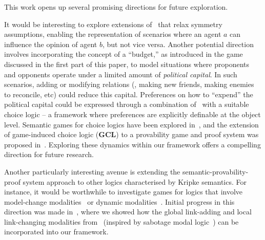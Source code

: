 
This work opens up several promising directions for future exploration.

It would be interesting to explore extensions of \PNL\ that relax symmetry assumptions, enabling the representation of scenarios where an agent $a$ can influence the opinion of agent $b$, but not vice versa. Another potential direction involves incorporating the concept of a ``budget,'' as introduced in the game discussed in the first part of this paper, to model situations where proponents and opponents operate under a limited amount of \emph{political capital}. In such scenarios, adding or modifying relations (\ie, making new friends, making enemies to reconcile, etc) could reduce this capital.
Preferences on how to ``expend'' the political capital could be expressed through a combination of \PNL\ with a suitable choice logic -- a framework where preferences are explicitly definable at the object level. Semantic games for choice logics have been explored in~\cite{Freiman2023TruthLogic}, and the extension of game-induced choice logic (\textbf{GCL}) to a provability game and proof system was proposed in~\cite{Freiman2023}. 
Exploring these dynamics within our framework
offers a compelling direction for future research.


Another particularly interesting avenue is extending the semantic-provability-proof system approach to other logics characterised by Kripke semantics. For instance, it would be worthwhile to investigate games for logics that involve model-change modalities~\cite{DBLP:journals/logcom/Velazquez-Quesada17,DBLP:journals/igpl/PerrotinV21} or dynamic modalities~\cite{DBLP:journals/synthese/BenthemGL08}. Initial progress in this direction was made in~\cite{LPAR2024:Reasoning_About_Group_Polarization}, where we showed how the global link-adding and local link-changing modalities from~\cite{DBLP:journals/logcom/PedersenSA21} (inspired by sabotage modal logic~\cite{DBLP:journals/igpl/ArecesFH15,DBLP:journals/logcom/AucherBG18,DBLP:journals/logcom/BenthemLSY23}) can be incorporated into our framework.


